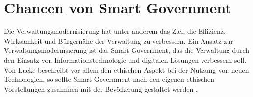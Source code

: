 \section{Chancen von Smart Government}
Die Verwaltungsmodernisierung hat unter anderem das Ziel, die Effizienz, Wirksamkeit und Bürgernähe der Verwaltung zu verbessern.
Ein Ansatz zur Verwaltungsmodernisierung ist das Smart Government, das die Verwaltung durch den Einsatz von Informationstechnologie und digitalen Lösungen verbessern soll.
Von Lucke beschreibt vor allem den ethischen Aspekt bei der Nutzung von neuen Technologien, so sollte Smart Government nach den eigenen ethischen Vorstellungen zusammen mit der Bevölkerung gestaltet werden \citep[Vgl.][S. 108]{Lucke2018}.


 
